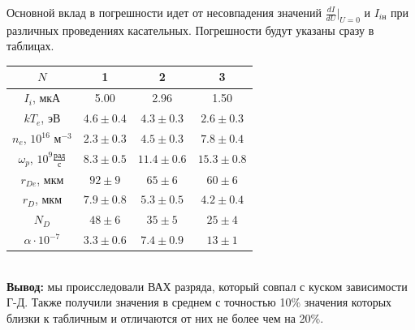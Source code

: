 \documentclass[a4paper,12pt]{extarticle}
\begin{document}
Основной вклад в погрешности идет от несовпадения значений $\frac{dI}{dU}|_{U=0}$ и $I_{i\text{н}}$ при различных проведениях касательных. Погрешности будут указаны сразу в таблицах. \\
\begin{tabular}{|c|c|c|c|}
\hline
$N$     & 1    & 2    & 3    \\ \hline
$I_i$, мкА    & 5.00 & 2.96 & 1.50 \\ \hline
$kT_e$, эВ    & $4.6\pm0.4$  & $4.3\pm0.3$  & $2.6\pm0.3$  \\ \hline
$n_e$, $10^{16}$ м$^{-3}$     & $2.3\pm0.3$ & $4.5\pm0.3$ & $7.8\pm0.4$ \\ \hline
$\omega_p$, $10^9 \frac{\text{рад}}{\text{с}}$     & $8.3\pm0.5$ & $11.4\pm0.6$ & $15.3\pm0.8$ \\ \hline
$r_{De}$, мкм & $92\pm9$  & $65\pm6$ & $60\pm6$ \\ \hline
$r_D$, мкм  & $7.9\pm0.8$  & $5.3\pm0.5$  & $4.2\pm0.4$  \\ \hline
$N_D$  & $48\pm6$ & $35\pm5$ & $25\pm4$ \\ \hline
$\alpha \cdot 10^{-7}$     & $3.3\pm0.6$  & $7.4\pm0.9$  & $13\pm1$ \\ \hline
\end{tabular} \\
{\large\textbf{Вывод:}} мы происследовали ВАХ разряда, который совпал с куском зависимости Г-Д. Также получили значения в среднем с точностью 10\% значения которых близки к табличным и отличаются от них не более чем на 20\%.  
\end{document}
